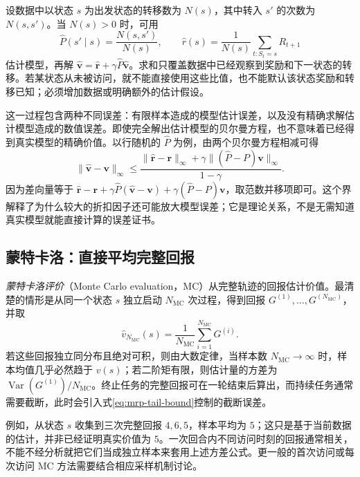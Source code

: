 \documentclass[UTF8,12pt,a4paper,fontset=fandol]{ctexart}
\begin{document}
设数据中以状态 $s$ 为出发状态的转移数为 $N(s)$，其中转入 $s'$ 的次数为 $N(s,s')$。当 $N(s)>0$ 时，可用
\begin{equation}
  \widehat P(s'\mid s)=\frac{N(s,s')}{N(s)},\qquad
  \widehat r(s)=\frac{1}{N(s)}\sum_{t:S_t=s}R_{t+1}
  \label{eq:mrp-model-estimates}
\end{equation}
估计模型，再解 $\widehat{\boldsymbol v}=\widehat{\boldsymbol r}+\gamma\widehat P\widehat{\boldsymbol v}$。求和只覆盖数据中已经观察到奖励和下一状态的转移。若某状态从未被访问，就不能直接使用这些比值，也不能默认该状态奖励和转移已知；必须增加数据或明确额外的估计假设。

这一过程包含两种不同误差：有限样本造成的模型估计误差，以及没有精确求解估计模型造成的数值误差。即使完全解出估计模型的贝尔曼方程，也不意味着已经得到真实模型的精确价值。以行随机的 $\widehat P$ 为例，由两个贝尔曼方程相减可得
\begin{equation}
  \|\widehat{\boldsymbol v}-\boldsymbol v\|_\infty
  \leq\frac{\|\widehat{\boldsymbol r}-\boldsymbol r\|_\infty
  +\gamma\|(\widehat P-P)\boldsymbol v\|_\infty}{1-\gamma}.
  \label{eq:mrp-model-error}
\end{equation}
因为差向量等于 $\widehat{\boldsymbol r}-\boldsymbol r+\gamma\widehat P(\widehat{\boldsymbol v}-\boldsymbol v)+\gamma(\widehat P-P)\boldsymbol v$，取范数并移项即可。这个界解释了为什么较大的折扣因子还可能放大模型误差；它是理论关系，不是无需知道真实模型就能直接计算的误差证书。

\subsection{蒙特卡洛：直接平均完整回报}

\emph{蒙特卡洛评价}（Monte Carlo evaluation，MC）从完整轨迹的回报估计价值。最清楚的情形是从同一个状态 $s$ 独立启动 $N_{\mathrm{MC}}$ 次过程，得到回报 $G^{(1)},\ldots,G^{(N_{\mathrm{MC}})}$，并取
\begin{equation}
  \widehat v_{N_{\mathrm{MC}}}(s)
  =\frac{1}{N_{\mathrm{MC}}}\sum_{i=1}^{N_{\mathrm{MC}}}G^{(i)}.
  \label{eq:mrp-mc}
\end{equation}
若这些回报独立同分布且绝对可积，则由大数定律，当样本数 $N_{\mathrm{MC}}\to\infty$ 时，样本均值几乎必然趋于 $v(s)$；若二阶矩有限，则估计量的方差为 $\operatorname{Var}(G^{(1)})/N_{\mathrm{MC}}$。终止任务的完整回报可在一轮结束后算出，而持续任务通常需要截断，此时会引入式\eqref{eq:mrp-tail-bound}控制的截断误差。

例如，从状态 $s$ 收集到三次完整回报 $4,6,5$，样本平均为 $5$；这只是基于当前数据的估计，并非已经证明真实价值为 $5$。一次回合内不同访问时刻的回报通常相关，不能不经分析就把它们当成独立样本来套用上述方差公式。更一般的首次访问或每次访问 MC 方法需要结合相应采样机制讨论。
\end{document}
